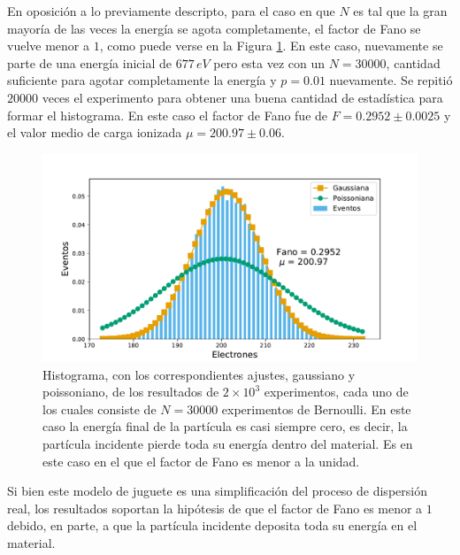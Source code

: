 En oposición a lo previamente descripto, para el caso en que $N$ es tal que la gran mayoría de las veces la energía se agota completamente, el factor de Fano se vuelve menor a $1$, como puede verse en la Figura \ref{fig:SimulacionOrden0Fano0}. En este caso, nuevamente se parte de una energía inicial de $677\,\si{eV}$ pero esta vez con un $N = 30000$, cantidad suficiente para agotar completamente la energía y $p=0.01$ nuevamente. Se repitió $20000$ veces el experimento para obtener una buena cantidad de estadística para formar el histograma. En este caso el factor de Fano fue de $F = 0.2952 \pm 0.0025$ y el valor medio de carga ionizada $\mu = 200.97 \pm 0.06$.
\begin{figure}[h]
    \centering
    \includegraphics[scale=0.5]{Figs/Orden0_fano0.pdf}
    \caption{Histograma, con los correspondientes ajustes, gaussiano y poissoniano, de los resultados de $2\times 10^3$ experimentos, cada uno de los cuales consiste de $N = 30000$ experimentos de Bernoulli. En este caso la energía final de la partícula es casi siempre cero, es decir, la partícula incidente pierde toda su energía dentro del material. Es en este caso en el que el factor de Fano es menor a la unidad.}
    \label{fig:SimulacionOrden0Fano0}
\end{figure}

Si bien este modelo de juguete es una simplificación del proceso de dispersión real, los resultados soportan la hipótesis de que el factor de Fano es menor a $1$ debido, en parte, a que la partícula incidente deposita toda su energía en el material.
